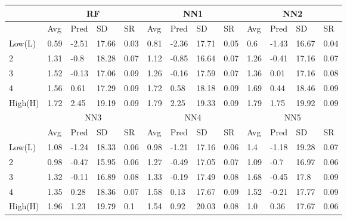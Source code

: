 \begin{tabularx}{\linewidth}{*{13}{X}}
 & \multicolumn{4}{c}{RF} & \multicolumn{4}{c}{NN1} & \multicolumn{4}{c}{NN2}\\
\hline
& Avg & Pred & SD & SR & Avg & Pred & SD & SR & Avg & Pred & SD & SR \\
\hline
Low(L)& 0.59& -2.51& 17.66& 0.03& 0.81& -2.36& 17.71& 0.05& 0.6& -1.43& 16.67& 0.04\\
2& 1.31& -0.8& 18.28& 0.07& 1.12& -0.85& 16.64& 0.07& 1.26& -0.41& 17.16& 0.07\\
3& 1.52& -0.13& 17.06& 0.09& 1.26& -0.16& 17.59& 0.07& 1.36& 0.01& 17.16& 0.08\\
4& 1.56& 0.61& 17.29& 0.09& 1.72& 0.58& 18.18& 0.09& 1.69& 0.44& 18.46& 0.09\\
High(H)& 1.72& 2.45& 19.19& 0.09& 1.79& 2.25& 19.33& 0.09& 1.79& 1.75& 19.92& 0.09\\
\hline
 & \multicolumn{4}{c}{NN3} & \multicolumn{4}{c}{NN4} & \multicolumn{4}{c}{NN5}\\
\hline
& Avg & Pred & SD & SR & Avg & Pred & SD & SR & Avg & Pred & SD & SR \\
\hline
Low(L)& 1.08& -1.24& 18.33& 0.06& 0.98& -1.21& 17.16& 0.06& 1.4& -1.18& 19.28& 0.07\\
2& 0.98& -0.47& 15.95& 0.06& 1.27& -0.49& 17.05& 0.07& 1.09& -0.7& 16.97& 0.06\\
3& 1.32& -0.11& 16.89& 0.08& 1.33& -0.19& 17.49& 0.08& 1.68& -0.45& 17.8& 0.09\\
4& 1.35& 0.28& 18.36& 0.07& 1.58& 0.13& 17.67& 0.09& 1.52& -0.21& 17.77& 0.09\\
High(H)& 1.96& 1.23& 19.79& 0.1& 1.54& 0.92& 20.03& 0.08& 1.0& 0.36& 17.67& 0.06\\
\hline
\end{tabularx}